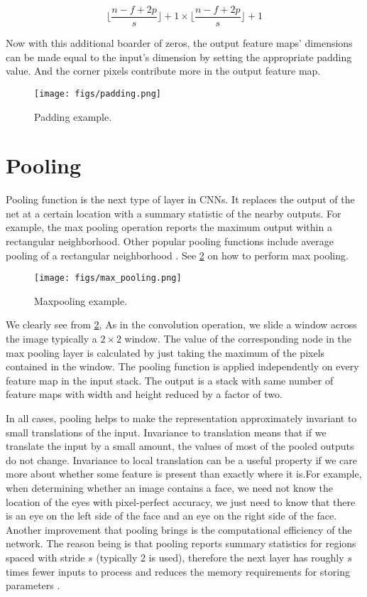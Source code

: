 \begin{equation}
  \label{conv_out_3}
  \lfloor\frac{n - f + 2p}{s}\rfloor + 1 \times \lfloor\frac{n - f + 2p}{s}\rfloor + 1
\end{equation}

Now with this additional boarder of zeros, the output feature maps' dimensions can be made equal to the input's dimension by setting the
appropriate padding value. And the corner pixels contribute more in the output feature map.

\begin{figure}[H]
  \centering
  \texttt{[image: figs/padding.png]}
  \caption{Padding example.}\label{fig:padding}
\end{figure}

\section{Pooling}

Pooling function is the next type of layer in CNNs. It replaces the output of the net at a certain location with
a summary statistic of the nearby outputs. For example, the max pooling operation reports the maximum output within a rectangular
neighborhood. Other popular pooling functions include average pooling of a rectangular neighborhood \cite{Ian16}.
See \cref{fig:maxpooling} on how to perform max pooling.

\begin{figure}[!htbp]
  \centering
  \texttt{[image: figs/max\_pooling.png]}
  \caption[Maxpooling example]{Maxpooling example.}\label{fig:maxpooling}
\end{figure}

We clearly see from \cref{fig:maxpooling}, As in the convolution operation, we slide a window across the image typically a $2 \times 2$ window. The value of the
corresponding node in the max pooling layer is calculated by just taking the maximum of the pixels contained in the window. The pooling function
is applied independently on every feature map in the input stack. The output is a stack with same number of feature maps with width and height
reduced by a factor of two.

In all cases, pooling helps to make the representation approximately invariant to small translations of the input. Invariance to translation means
that if we translate the input by a small amount, the values of most of the pooled outputs do not change. Invariance to local translation can be a
useful property if we care more about whether some feature is present than exactly where it is.For example, when determining whether an image
contains a face, we need not know the location of the eyes with pixel-perfect accuracy, we just need to know that there is an eye on the left side
of the face and an eye on the right side of the face. Another improvement that pooling brings is the computational efficiency of the network. The
reason being is that pooling reports summary statistics for regions spaced with stride $s$ (typically 2 is used), therefore the next layer has
roughly $s$ times fewer inputs to process and reduces the memory requirements for storing parameters \cite{Ian16}. \\

